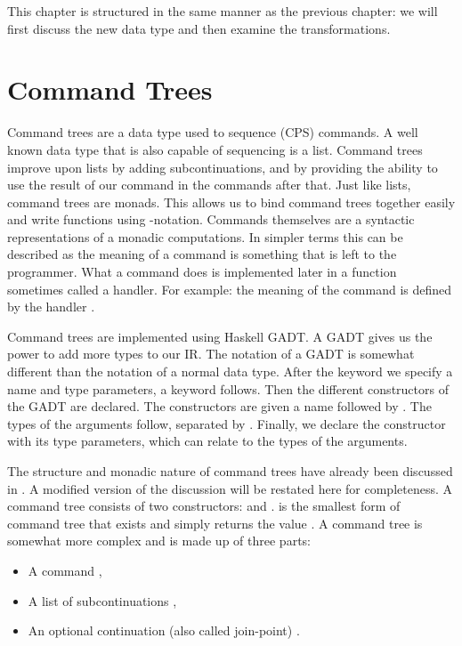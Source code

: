 This chapter is structured in the same manner as the previous chapter: we will first discuss the new  data type and then examine the  transformations.

\section{\label{section:commandtree}Command Trees}
Command trees are a data type used to sequence (CPS) commands. A well known data type that is also capable of sequencing is a list. Command trees improve upon lists by adding subcontinuations, and by providing the ability to use the result of our command in the commands after that. Just like lists, command trees are monads. This allows us to bind command trees together easily and write functions using -notation. Commands themselves are a syntactic representations of a monadic computations. In simpler terms this can be described as the meaning of a command is something that is left to the programmer. What a command does is implemented later in a function sometimes called a handler. For example: the meaning of the  command is defined by the handler .

Command trees are implemented using Haskell GADT. A GADT gives us the power to add more types to our IR. The notation of a GADT is somewhat different than the notation of a normal data type. After the  keyword we specify a name and type parameters, a  keyword follows. Then the different constructors of the GADT are declared. The constructors are given a name followed by \icode{::}. The types of the arguments follow, separated by \icode{->}. Finally, we declare the constructor with its type parameters, which can relate to the types of the arguments.

The structure and monadic nature of command trees have already been discussed in  \autocite{commandtreespoulsen}. A modified version of the discussion will be restated here for completeness. A command tree consists of two constructors:  and .  is the smallest form of command tree that exists and simply returns the value . A  command tree is somewhat more complex and is made up of three parts:

\begin{itemize}
\item A command ,
\item A list of subcontinuations ,
\item An optional continuation (also called join-point) .
\end{itemize}

